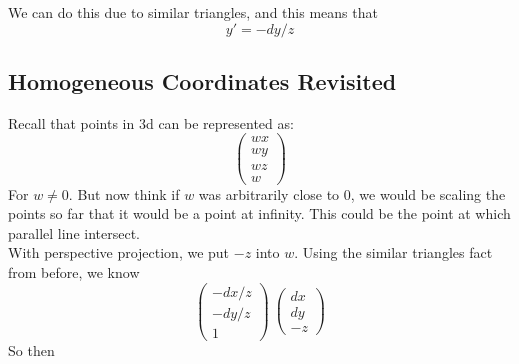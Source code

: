 \documentclass[12pt]{article}
\theoremstyle{definition}
\begin{document}
We can do this due to similar triangles, and this means that $$y' = -dy/z$$
\subsection{Homogeneous Coordinates Revisited}
Recall that points in 3d can be represented as:
$$\begin{pmatrix}
wx \\ wy \\ wz \\ w
\end{pmatrix}$$
For $w \neq 0$. But now think if $w$ was arbitrarily close to 0, we would be scaling the points so far that it would be a point at infinity. This could be the point at which parallel line intersect.
\\ \linebreak
With perspective projection, we put $-z$ into $w$. Using the similar triangles fact from before, we know
$$\begin{pmatrix}
-dx/z \\ -dy/z \\ 1
\end{pmatrix}~\begin{pmatrix}
dx \\ dy \\-z
\end{pmatrix}$$
So then 
\end{document}
